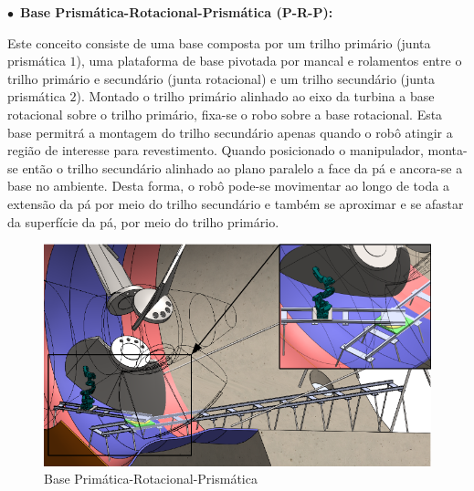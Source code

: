 $\bullet$~\textbf{Base Prismática-Rotacional-Prismática (P-R-P):}

  Este conceito consiste de uma base composta por um trilho primário (junta
  prismática $1$), uma plataforma de base pivotada por mancal e rolamentos entre
  o trilho primário e secundário (junta rotacional) e um trilho secundário
  (junta prismática $2$). Montado o trilho primário alinhado ao eixo da turbina
  a base rotacional sobre o trilho primário, fixa-se o robo sobre a base
  rotacional. Esta base permitrá a montagem do trilho secundário apenas quando o
  robô atingir a região de interesse para revestimento. Quando posicionado o
  manipulador, monta-se então o trilho secundário alinhado ao plano paralelo a
  face da pá e ancora-se a base no ambiente. Desta forma, o robô pode-se
  movimentar ao longo de toda a extensão da pá por meio do trilho secundário e
  também se aproximar e se afastar da superfície da pá, por meio do trilho
  primário. 

\begin{figure}[h!]
   \centering
   \includegraphics[width=0.8\columnwidth]{figs/bases/base_prp}
   \caption{Base Primática-Rotacional-Prismática}
   \label{fig::base_prp}
\end{figure}
  